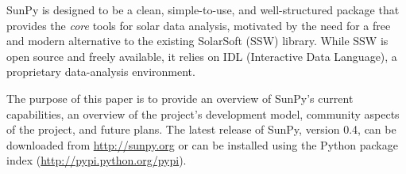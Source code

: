 SunPy is designed to be a clean, simple-to-use, and well-structured package that provides 
the \textit{core} tools for solar data analysis, motivated by the need for a free and 
modern alternative to the existing SolarSoft (SSW) library. While SSW is open source 
and freely available, it relies on IDL (Interactive Data Language), a proprietary 
data-analysis environment.

The purpose of this paper is to provide an overview of SunPy's current
capabilities, an overview of the project's development model, community aspects of the
project, and future plans. The latest release of SunPy, version 0.4,
can be downloaded from \url{http://sunpy.org} or can be
installed using the Python package index (\url{http://pypi.python.org/pypi}).